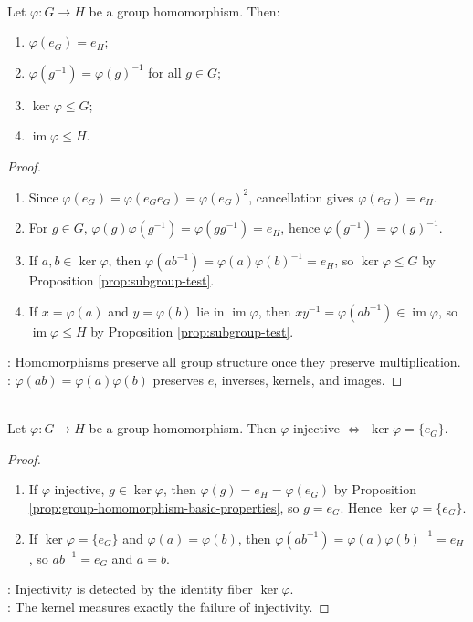 \begin{proposition} \label{prop:group-homomorphism-basic-properties} \\
Let $\varphi:G\to H$ be a group homomorphism. Then:
\begin{enumerate}[label=(\roman*)]
\setlength{\itemsep}{0pt}
\item $\varphi(e_G)=e_H$;
\item $\varphi(g^{-1})=\varphi(g)^{-1}$ for all $g\in G$;
\item $\ker\varphi\leq G$;
\item $\operatorname{im}\varphi\leq H$.
\end{enumerate}
\begin{proof}
\begin{enumerate}[label=(\roman*)]
\setlength{\itemsep}{0pt}
\item Since $\varphi(e_G)=\varphi(e_Ge_G)=\varphi(e_G)^2$, cancellation gives $\varphi(e_G)=e_H$.
\item For $g\in G$, $\varphi(g)\varphi(g^{-1})=\varphi(gg^{-1})=e_H$, hence $\varphi(g^{-1})=\varphi(g)^{-1}$.
\item If $a,b\in\ker\varphi$, then $\varphi(ab^{-1})=\varphi(a)\varphi(b)^{-1}=e_H$, so $\ker\varphi\leq G$ by Proposition \ref{prop:subgroup-test}.
\item If $x=\varphi(a)$ and $y=\varphi(b)$ lie in $\operatorname{im}\varphi$, then $xy^{-1}=\varphi(ab^{-1})\in\operatorname{im}\varphi$, so $\operatorname{im}\varphi\leq H$ by Proposition \ref{prop:subgroup-test}.
\end{enumerate}
: Homomorphisms preserve all group structure once they preserve multiplication.\\
: $\varphi(ab)=\varphi(a)\varphi(b)$ preserves $e$, inverses, kernels, and images.
\end{proof}
\end{proposition}

\begin{proposition} \label{prop:group-homomorphism-injective-kernel} \\
Let $\varphi:G\to H$ be a group homomorphism. Then $\varphi$ injective $\iff$ $\ker\varphi=\{e_G\}$.
\begin{proof}
\begin{enumerate}[label=\roman*.]
\setlength{\itemsep}{0pt}
\item[$(\Rightarrow)$] If $\varphi$ injective, $g\in\ker\varphi$, then $\varphi(g)=e_H=\varphi(e_G)$ by Proposition \ref{prop:group-homomorphism-basic-properties}, so $g=e_G$. Hence $\ker\varphi=\{e_G\}$.
\item[$(\Leftarrow)$] If $\ker\varphi=\{e_G\}$ and $\varphi(a)=\varphi(b)$, then $\varphi(ab^{-1})=\varphi(a)\varphi(b)^{-1}=e_H$, so $ab^{-1}=e_G$ and $a=b$.
\end{enumerate}
: Injectivity is detected by the identity fiber $\ker\varphi$.\\
: The kernel measures exactly the failure of injectivity.
\end{proof}
\end{proposition}
